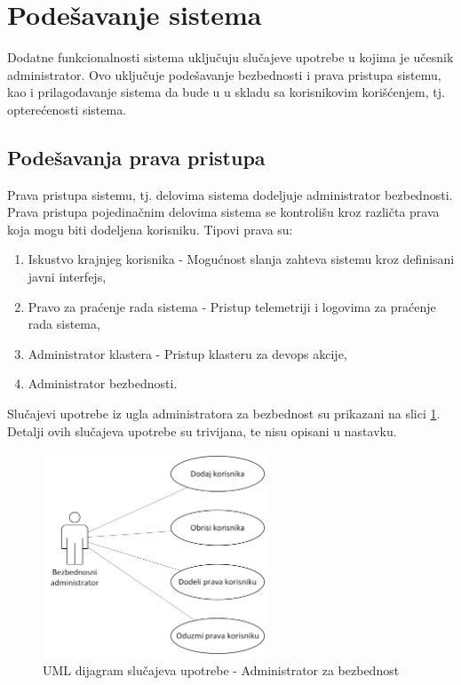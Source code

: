 \documentclass[12pt,oneside]{memoir}
\begin{document}
\section{Podešavanje sistema}
Dodatne funkcionalnosti sistema uključuju slučajeve upotrebe u kojima je učesnik administrator. Ovo uključuje podešavanje bezbednosti i prava pristupa sistemu, kao i prilagođavanje sistema da bude u u skladu sa korisnikovim korišćenjem, tj. opterećenosti sistema.


\subsection{Podešavanja prava pristupa}
Prava pristupa sistemu, tj. delovima sistema dodeljuje administrator bezbednosti. Prava pristupa pojedinačnim delovima sistema se kontrolišu kroz različta prava koja mogu biti dodeljena korisniku. Tipovi prava su:
	\begin{enumerate}
	\item Iskustvo krajnjeg korisnika - Mogućnost slanja zahteva sistemu kroz definisani javni interfejs,
	\item Pravo za praćenje rada sistema - Pristup telemetriji i logovima za praćenje rada sistema,
	\item Administrator klastera - Pristup klasteru za devops akcije,
	\item Administrator bezbednosti.
	\end{enumerate}
Slučajevi upotrebe iz ugla administratora za bezbednost su prikazani na slici \ref{fig:slucajupotrebe_aadadmin}. Detalji ovih slučajeva upotrebe su trivijana, te nisu opisani u nastavku.

\begin{figure}[!ht]
  \centering
  \label{fig:slucajupotrebe_aadadmin}
  \includegraphics[width=0.6\textwidth]{./images/dijagram_slucajeva_upotrebe_administrator_sistema_aadadmin.png}
  \caption{UML dijagram slučajeva upotrebe - Administrator za bezbednost}
\end{figure}
\end{document}
